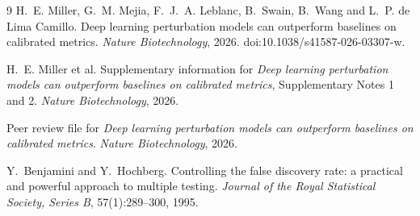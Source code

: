 \documentclass[11pt]{article}
\theoremstyle{definition}
\begin{document}
\begin{thebibliography}{9}
H.~E. Miller, G.~M. Mejia, F.~J.~A. Leblanc, B.~Swain, B.~Wang and L.~P. de Lima Camillo.
\newblock Deep learning perturbation models can outperform baselines on calibrated metrics.
\newblock \emph{Nature Biotechnology}, 2026. doi:10.1038/s41587-026-03307-w.

H.~E. Miller et al.
\newblock Supplementary information for \emph{Deep learning perturbation models can outperform baselines on calibrated metrics}, Supplementary Notes 1 and 2.
\newblock \emph{Nature Biotechnology}, 2026.

\newblock Peer review file for \emph{Deep learning perturbation models can outperform baselines on calibrated metrics}.
\newblock \emph{Nature Biotechnology}, 2026.

Y.~Benjamini and Y.~Hochberg.
\newblock Controlling the false discovery rate: a practical and powerful approach to multiple testing.
\newblock \emph{Journal of the Royal Statistical Society, Series B}, 57(1):289--300, 1995.
\end{thebibliography}
\end{document}
